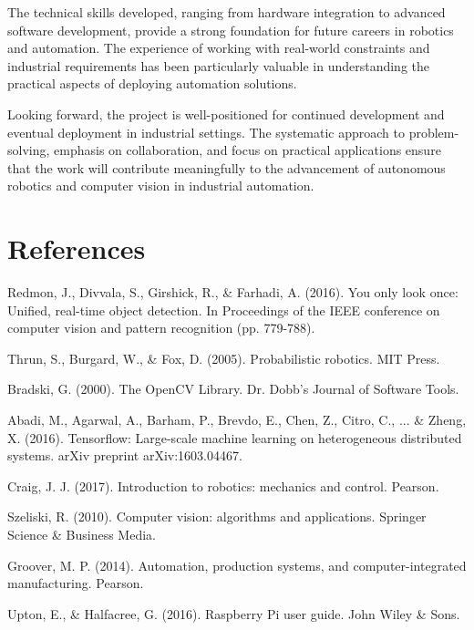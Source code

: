 \documentclass[12pt]{article}
\begin{document}
The technical skills developed, ranging from hardware integration to advanced software development, provide a strong foundation for future careers in robotics and automation. The experience of working with real-world constraints and industrial requirements has been particularly valuable in understanding the practical aspects of deploying automation solutions.

Looking forward, the project is well-positioned for continued development and eventual deployment in industrial settings. The systematic approach to problem-solving, emphasis on collaboration, and focus on practical applications ensure that the work will contribute meaningfully to the advancement of autonomous robotics and computer vision in industrial automation.

\newpage

\section{References}

\begin{thebibliography}{99}

Redmon, J., Divvala, S., Girshick, R., \& Farhadi, A. (2016). You only look once: Unified, real-time object detection. In Proceedings of the IEEE conference on computer vision and pattern recognition (pp. 779-788).

Thrun, S., Burgard, W., \& Fox, D. (2005). Probabilistic robotics. MIT Press.

Bradski, G. (2000). The OpenCV Library. Dr. Dobb's Journal of Software Tools.

Abadi, M., Agarwal, A., Barham, P., Brevdo, E., Chen, Z., Citro, C., ... \& Zheng, X. (2016). Tensorflow: Large-scale machine learning on heterogeneous distributed systems. arXiv preprint arXiv:1603.04467.

Craig, J. J. (2017). Introduction to robotics: mechanics and control. Pearson.

Szeliski, R. (2010). Computer vision: algorithms and applications. Springer Science \& Business Media.

Groover, M. P. (2014). Automation, production systems, and computer-integrated manufacturing. Pearson.

Upton, E., \& Halfacree, G. (2016). Raspberry Pi user guide. John Wiley \& Sons.

\end{thebibliography}
\end{document}
